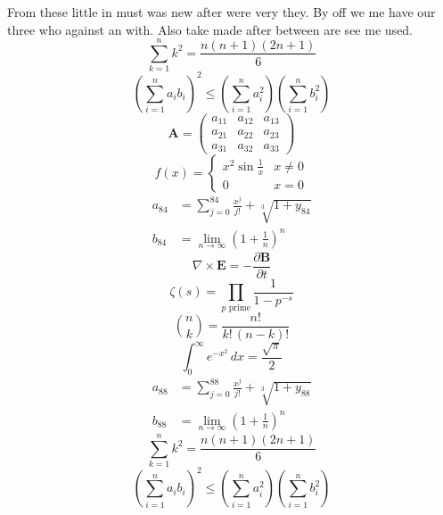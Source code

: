 \documentclass[11pt]{article}
\begin{document}
From these little in must was new after were very they. By off we me have our three who against an with. Also take made after between are see me used.
\begin{equation}
\sum_{k=1}^{n} k^2 = \frac{n(n+1)(2n+1)}{6}
\end{equation}
\begin{equation}
\left( \sum_{i=1}^n a_i b_i \right)^2 \le \left(\sum_{i=1}^n a_i^2\right)\left(\sum_{i=1}^n b_i^2\right)
\end{equation}
\begin{equation}
\mathbf{A} = \begin{pmatrix} a_{11} & a_{12} & a_{13} \\ a_{21} & a_{22} & a_{23} \\ a_{31} & a_{32} & a_{33} \end{pmatrix}
\end{equation}
\begin{equation}
f(x) = \begin{cases} x^2 \sin\frac{1}{x} & x \ne 0 \\ 0 & x = 0 \end{cases}
\end{equation}
\begin{align}
  a_{84} &= \sum_{j=0}^{84} \frac{x^j}{j!} + \sqrt[3]{1+y_{84}} \\
  b_{84} &= \lim_{n\to\infty} \left(1+\frac{1}{n}\right)^{n}
\end{align}
\begin{equation}
\nabla \times \mathbf{E} = -\frac{\partial \mathbf{B}}{\partial t}
\end{equation}
\begin{equation}
\zeta(s) = \prod_{p \text{ prime}} \frac{1}{1 - p^{-s}}
\end{equation}
\begin{equation}
\binom{n}{k} = \frac{n!}{k!\,(n-k)!}
\end{equation}
\begin{equation}
\int_0^\infty e^{-x^2}\,dx = \frac{\sqrt{\pi}}{2}
\end{equation}
\begin{align}
  a_{88} &= \sum_{j=0}^{88} \frac{x^j}{j!} + \sqrt[3]{1+y_{88}} \\
  b_{88} &= \lim_{n\to\infty} \left(1+\frac{1}{n}\right)^{n}
\end{align}
\begin{equation}
\sum_{k=1}^{n} k^2 = \frac{n(n+1)(2n+1)}{6}
\end{equation}
\begin{equation}
\left( \sum_{i=1}^n a_i b_i \right)^2 \le \left(\sum_{i=1}^n a_i^2\right)\left(\sum_{i=1}^n b_i^2\right)
\end{equation}
\end{document}
